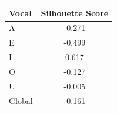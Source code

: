 \begin{tabular}{lc}
\toprule
\rowcolor{col01}
Vocal & Silhouette Score \\
\midrule
A & -0.271 \\
E & -0.499 \\
I & 0.617 \\
O & -0.127 \\
U & -0.005 \\
Global & -0.161 \\
\bottomrule
\end{tabular}
